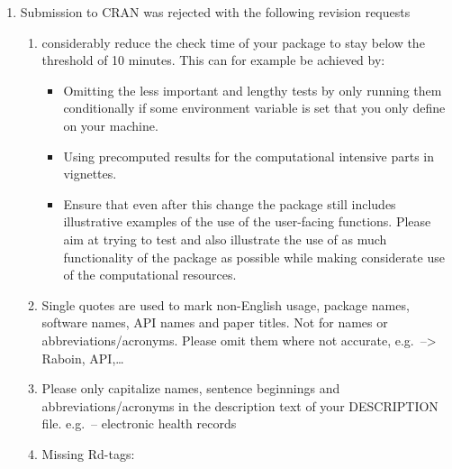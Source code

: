 \documentclass[
]{article}
\providecommand{\tightlist}{%
  \setlength{\itemsep}{0pt}\setlength{\parskip}{0pt}}
\begin{document}
\begin{enumerate}
\def\labelenumi{\arabic{enumi}.}
\tightlist
\item
  Submission to CRAN was rejected with the following revision requests

  \begin{enumerate}
  \def\labelenumii{\arabic{enumii}.}
  \tightlist
  \item
    considerably reduce the check time of your package to stay below the
    threshold of 10 minutes. This can for example be achieved by:

    \begin{itemize}
    \tightlist
    \item
      Omitting the less important and lengthy tests by only running them
      conditionally if some environment variable is set that you only
      define on your machine.
    \item
      Using precomputed results for the computational intensive parts in
      vignettes.
    \item
      Ensure that even after this change the package still includes
      illustrative examples of the use of the user-facing functions.
      Please aim at trying to test and also illustrate the use of as
      much functionality of the package as possible while making
      considerate use of the computational resources.
    \end{itemize}
  \item
    Single quotes are used to mark non-English usage, package names,
    software names, API names and paper titles. Not for names or
    abbreviations/acronyms. Please omit them where not accurate,
    e.g.~--\textgreater{} Raboin, API,\ldots{}
  \item
    Please only capitalize names, sentence beginnings and
    abbreviations/acronyms in the description text of your DESCRIPTION
    file. e.g.~-- electronic health records
  \item
    Missing Rd-tags:


\end{enumerate}
\end{enumerate}
\end{document}
